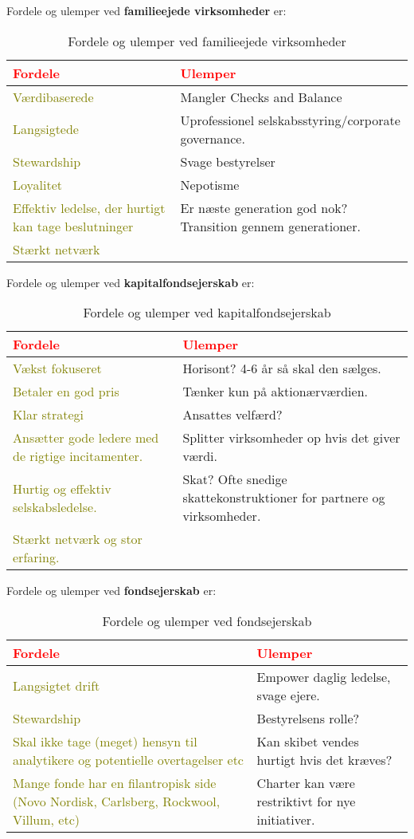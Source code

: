 \documentclass[10pt,reqno, usenames]{article}
\begin{document}
\newpage
Fordele og ulemper ved \textbf{familieejede virksomheder} er:

\begin{table}[h!]
\centering
\begin{tabular}{|m{5cm}|m{5cm}|}
\hline
\centering \textbf{\textcolor{red}{Fordele}} & \centering \textbf{\textcolor{red}{Ulemper}} \tabularnewline
\hline
\textcolor{olive}{Værdibaserede} & Mangler Checks and Balance \tabularnewline
\hline
\textcolor{olive}{Langsigtede} & Uprofessionel selskabsstyring/corporate governance. \tabularnewline
\hline
\textcolor{olive}{Stewardship} & Svage bestyrelser \tabularnewline
\hline
\textcolor{olive}{Loyalitet} & Nepotisme \tabularnewline
\hline
\textcolor{olive}{Effektiv ledelse, der hurtigt kan tage beslutninger} & Er næste generation god nok? Transition gennem generationer. \tabularnewline
\hline
\textcolor{olive}{Stærkt netværk} & \tabularnewline
\hline
\end{tabular}
\caption{Fordele og ulemper ved familieejede virksomheder}
\end{table}

Fordele og ulemper ved \textbf{kapitalfondsejerskab} er:

\begin{table}[h!]
\centering
\begin{tabular}{|m{6cm}|m{6cm}|}
\hline
\centering \textbf{\textcolor{red}{Fordele}} & \centering \textbf{\textcolor{red}{Ulemper}} \tabularnewline
\hline
\textcolor{olive}{Vækst fokuseret} & Horisont? 4-6 år så skal den sælges. \tabularnewline
\hline
\textcolor{olive}{Betaler en god pris} & Tænker kun på aktionærværdien. \tabularnewline
\hline
\textcolor{olive}{Klar strategi} & Ansattes velfærd? \tabularnewline
\hline
\textcolor{olive}{Ansætter gode ledere med de rigtige incitamenter.} & Splitter virksomheder op hvis det giver værdi. \tabularnewline
\hline
\textcolor{olive}{Hurtig og effektiv selskabsledelse.} & Skat? Ofte snedige skattekonstruktioner for partnere og virksomheder. \tabularnewline
\hline
\textcolor{olive}{Stærkt netværk og stor erfaring.} & \tabularnewline
\hline
\end{tabular}
\caption{Fordele og ulemper ved kapitalfondsejerskab}
\end{table}

Fordele og ulemper ved \textbf{fondsejerskab} er:

\begin{table}[h!]
\centering
\begin{tabular}{|m{6cm}|m{6cm}|}
\hline
\centering \textbf{\textcolor{red}{Fordele}} & \centering \textbf{\textcolor{red}{Ulemper}} \tabularnewline
\hline
\textcolor{olive}{Langsigtet drift} & Empower daglig ledelse, svage ejere. \tabularnewline
\hline
\textcolor{olive}{Stewardship} & Bestyrelsens rolle? \tabularnewline
\hline
\textcolor{olive}{Skal ikke tage (meget) hensyn til analytikere og potentielle overtagelser etc} & Kan skibet vendes hurtigt hvis det kræves? \tabularnewline
\hline
\textcolor{olive}{Mange fonde har en filantropisk side (Novo Nordisk, Carlsberg, Rockwool, Villum, etc)} & Charter kan være restriktivt for nye initiativer. \tabularnewline
\hline
\end{tabular}
\caption{Fordele og ulemper ved fondsejerskab}
\end{table}
\end{document}
